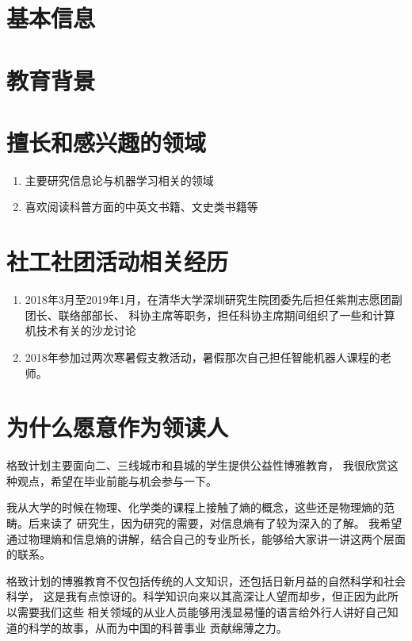 \documentclass[12pt,colorlinks,linkcolor=true]{moderncv}
\begin{document}
\makecvtitle
\section{基本信息}
\section{教育背景}
\section{擅长和感兴趣的领域}
\begin{enumerate}
\item 主要研究信息论与机器学习相关的领域
\item 喜欢阅读科普方面的中英文书籍、文史类书籍等
\end{enumerate}
\section{社工社团活动相关经历}
\begin{enumerate}
\item
2018年3月至2019年1月，在清华大学深圳研究生院团委先后担任紫荆志愿团副团长、联络部部长、
科协主席等职务，担任科协主席期间组织了一些和计算机技术有关的沙龙讨论
\item 2018年参加过两次寒暑假支教活动，暑假那次自己担任智能机器人课程的老师。
\end{enumerate}
\section{为什么愿意作为领读人}
格致计划主要面向二、三线城市和县城的学生提供公益性博雅教育，
我很欣赏这种观点，希望在毕业前能与机会参与一下。

我从大学的时候在物理、化学类的课程上接触了熵的概念，这些还是物理熵的范畴。后来读了
研究生，因为研究的需要，对信息熵有了较为深入的了解。
我希望通过物理熵和信息熵的讲解，结合自己的专业所长，能够给大家讲一讲这两个层面的联系。

格致计划的博雅教育不仅包括传统的人文知识，还包括日新月益的自然科学和社会科学，
这是我有点惊讶的。科学知识向来以其高深让人望而却步，但正因为此所以需要我们这些
相关领域的从业人员能够用浅显易懂的语言给外行人讲好自己知道的科学的故事，从而为中国的科普事业
贡献绵薄之力。
\end{document}
